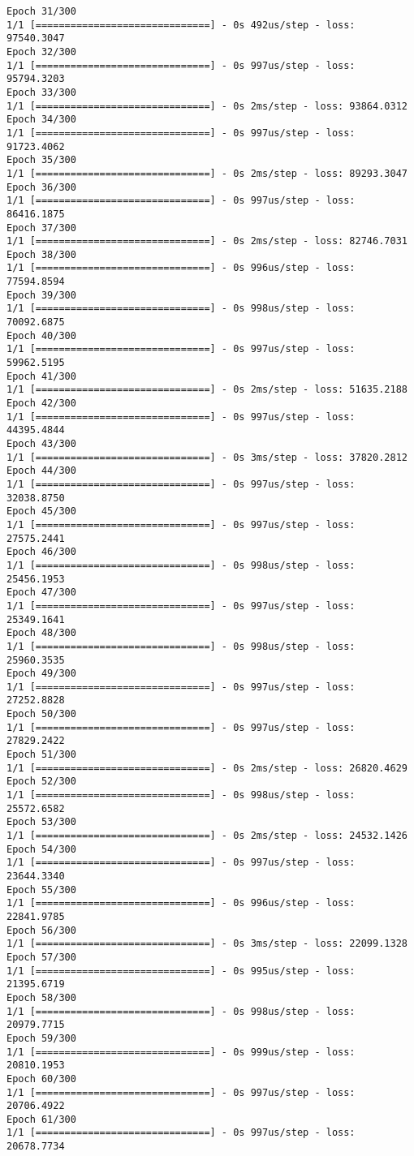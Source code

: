 \documentclass[11pt]{article}
\begin{document}
\begin{Verbatim}[commandchars=\\\{\}]
Epoch 31/300
1/1 [==============================] - 0s 492us/step - loss: 97540.3047
Epoch 32/300
1/1 [==============================] - 0s 997us/step - loss: 95794.3203
Epoch 33/300
1/1 [==============================] - 0s 2ms/step - loss: 93864.0312
Epoch 34/300
1/1 [==============================] - 0s 997us/step - loss: 91723.4062
Epoch 35/300
1/1 [==============================] - 0s 2ms/step - loss: 89293.3047
Epoch 36/300
1/1 [==============================] - 0s 997us/step - loss: 86416.1875
Epoch 37/300
1/1 [==============================] - 0s 2ms/step - loss: 82746.7031
Epoch 38/300
1/1 [==============================] - 0s 996us/step - loss: 77594.8594
Epoch 39/300
1/1 [==============================] - 0s 998us/step - loss: 70092.6875
Epoch 40/300
1/1 [==============================] - 0s 997us/step - loss: 59962.5195
Epoch 41/300
1/1 [==============================] - 0s 2ms/step - loss: 51635.2188
Epoch 42/300
1/1 [==============================] - 0s 997us/step - loss: 44395.4844
Epoch 43/300
1/1 [==============================] - 0s 3ms/step - loss: 37820.2812
Epoch 44/300
1/1 [==============================] - 0s 997us/step - loss: 32038.8750
Epoch 45/300
1/1 [==============================] - 0s 997us/step - loss: 27575.2441
Epoch 46/300
1/1 [==============================] - 0s 998us/step - loss: 25456.1953
Epoch 47/300
1/1 [==============================] - 0s 997us/step - loss: 25349.1641
Epoch 48/300
1/1 [==============================] - 0s 998us/step - loss: 25960.3535
Epoch 49/300
1/1 [==============================] - 0s 997us/step - loss: 27252.8828
Epoch 50/300
1/1 [==============================] - 0s 997us/step - loss: 27829.2422
Epoch 51/300
1/1 [==============================] - 0s 2ms/step - loss: 26820.4629
Epoch 52/300
1/1 [==============================] - 0s 998us/step - loss: 25572.6582
Epoch 53/300
1/1 [==============================] - 0s 2ms/step - loss: 24532.1426
Epoch 54/300
1/1 [==============================] - 0s 997us/step - loss: 23644.3340
Epoch 55/300
1/1 [==============================] - 0s 996us/step - loss: 22841.9785
Epoch 56/300
1/1 [==============================] - 0s 3ms/step - loss: 22099.1328
Epoch 57/300
1/1 [==============================] - 0s 995us/step - loss: 21395.6719
Epoch 58/300
1/1 [==============================] - 0s 998us/step - loss: 20979.7715
Epoch 59/300
1/1 [==============================] - 0s 999us/step - loss: 20810.1953
Epoch 60/300
1/1 [==============================] - 0s 997us/step - loss: 20706.4922
Epoch 61/300
1/1 [==============================] - 0s 997us/step - loss: 20678.7734

\end{Verbatim}
\end{document}
